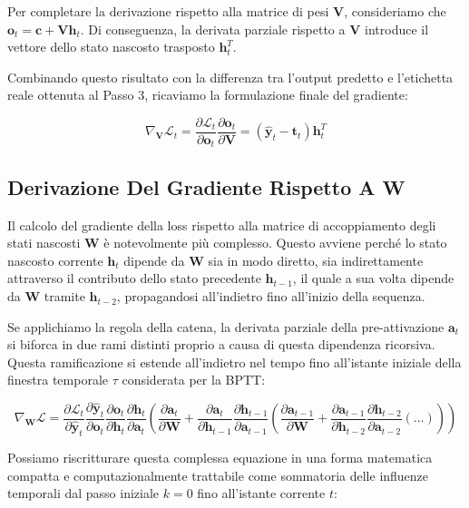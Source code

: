 ﻿\documentclass[11pt, a4paper]{article}
\begin{document}
Per completare la derivazione rispetto alla matrice di pesi $\bm{V}$, consideriamo che $\bm{o}_t = \bm{c} + \bm{V}\bm{h}_t$. Di conseguenza, la derivata parziale rispetto a $\bm{V}$ introduce il vettore dello stato nascosto trasposto $\bm{h}_t^T$.

Combinando questo risultato con la differenza tra l'output predetto e l'etichetta reale ottenuta al Passo 3, ricaviamo la formulazione finale del gradiente:

\[
\nabla_{\bm{V}}\mathcal{L}_t = \frac{\partial \mathcal{L}_t}{\partial \bm{o}_{t}} \frac{\partial \bm{o}_{t}}{\partial \bm{V}} = \boxed{(\hat{\bm{y}}_t - \bm{t}_t)\bm{h}_t^T}
\]

\newpage

\subsection{Derivazione Del Gradiente Rispetto A W}

Il calcolo del gradiente della loss rispetto alla matrice di accoppiamento degli stati nascosti $\bm{W}$ è notevolmente più complesso. Questo avviene perché lo stato nascosto corrente $\bm{h}_t$ dipende da $\bm{W}$ sia in modo diretto, sia indirettamente attraverso il contributo dello stato precedente $\bm{h}_{t-1}$, il quale a sua volta dipende da $\bm{W}$ tramite $\bm{h}_{t-2}$, propagandosi all'indietro fino all'inizio della sequenza.

Se applichiamo la regola della catena, la derivata parziale della pre-attivazione $\bm{a}_t$ si biforca in due rami distinti proprio a causa di questa dipendenza ricorsiva. Questa ramificazione si estende all'indietro nel tempo fino all'istante iniziale della finestra temporale $\tau$ considerata per la BPTT:

\[
\nabla_{\bm{W}}\mathcal{L} = \frac{\partial \mathcal{L}_t}{\partial \hat{\bm{y}}_t} \frac{\partial \hat{\bm{y}}_t}{\partial \bm{o}_t} \frac{\partial \bm{o}_t}{\partial \bm{h}_t} \frac{\partial \bm{h}_t}{\partial \bm{a}_t} \left( \frac{\partial \bm{a}_t}{\partial \bm{W}} + \frac{\partial \bm{a}_t}{\partial \bm{h}_{t-1}} \frac{\partial \bm{h}_{t-1}}{\partial \bm{a}_{t-1}} \left( \frac{\partial \bm{a}_{t-1}}{\partial \bm{W}} + \frac{\partial \bm{a}_{t-1}}{\partial \bm{h}_{t-2}} \frac{\partial \bm{h}_{t-2}}{\partial \bm{a}_{t-2}} (\dots) \right) \right)
\]

Possiamo riscritturare questa complessa equazione in una forma matematica compatta e computazionalmente trattabile come sommatoria delle influenze temporali dal passo iniziale $k=0$ fino all'istante corrente $t$:
\end{document}
